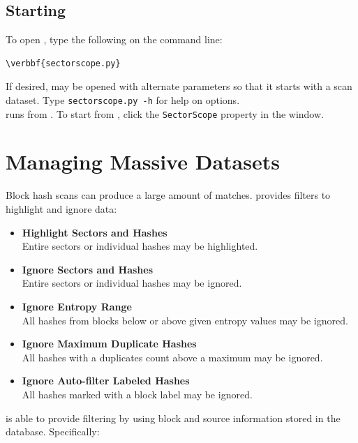 \documentclass[11pt,fleqn]{article} %
\begin{document}
\subsection{Starting \sscope}
To open \sscope, type the following on the command line:
\begin{Verbatim}[commandchars=\\\{\}]
\verbbf{sectorscope.py}
\end{Verbatim}
If desired, \sscope may be opened with alternate parameters so that it starts with a scan dataset. Type \verb+sectorscope.py -h+ for help on options.\\

\sscope runs from \aut. To start \sscope from \aut, click the \verb+SectorScope+ property in the \aut window.

\section{Managing Massive Datasets}
Block hash scans can produce a large amount of matches. \sscope provides filters to highlight and ignore data:
\begin{itemize}
\item \textbf{Highlight Sectors and Hashes}\\
Entire sectors or individual hashes may be highlighted.
\item \textbf{Ignore Sectors and Hashes}\\
Entire sectors or individual hashes may be ignored.
\item \textbf{Ignore Entropy Range}\\
All hashes from blocks below or above given entropy values may be ignored.
\item \textbf{Ignore Maximum Duplicate Hashes}\\
All hashes with a duplicates count above a maximum may be ignored.
\item \textbf{Ignore Auto-filter Labeled Hashes}\\
All hashes marked with a block label may be ignored.
\end{itemize}
\sscope is able to provide filtering by using block and source information stored in the \hdb database. Specifically:
\end{document}
